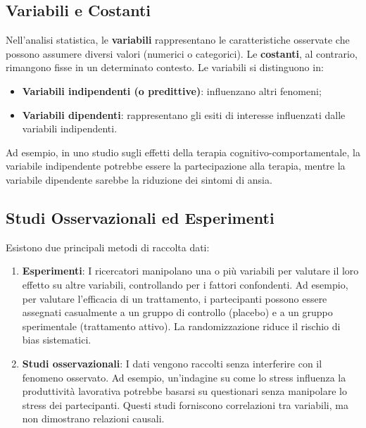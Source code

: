 \documentclass[
  letterpaper,
]{krantz}
\providecommand{\tightlist}{%
  \setlength{\itemsep}{0pt}\setlength{\parskip}{0pt}}\usepackage{longtable,booktabs,array}
\begin{document}
\subsection{Variabili e Costanti}\label{variabili-e-costanti}

Nell'analisi statistica, le \textbf{variabili} rappresentano le
caratteristiche osservate che possono assumere diversi valori (numerici
o categorici). Le \textbf{costanti}, al contrario, rimangono fisse in un
determinato contesto. Le variabili si distinguono in:

\begin{itemize}
\tightlist
\item
  \textbf{Variabili indipendenti (o predittive)}: influenzano altri
  fenomeni;\\
\item
  \textbf{Variabili dipendenti}: rappresentano gli esiti di interesse
  influenzati dalle variabili indipendenti.
\end{itemize}

Ad esempio, in uno studio sugli effetti della terapia
cognitivo-comportamentale, la variabile indipendente potrebbe essere la
partecipazione alla terapia, mentre la variabile dipendente sarebbe la
riduzione dei sintomi di ansia.

\subsection{Studi Osservazionali ed
Esperimenti}\label{studi-osservazionali-ed-esperimenti}

Esistono due principali metodi di raccolta dati:

\begin{enumerate}
\def\labelenumi{\arabic{enumi}.}
\item
  \textbf{Esperimenti}: I ricercatori manipolano una o più variabili per
  valutare il loro effetto su altre variabili, controllando per i
  fattori confondenti. Ad esempio, per valutare l'efficacia di un
  trattamento, i partecipanti possono essere assegnati casualmente a un
  gruppo di controllo (placebo) e a un gruppo sperimentale (trattamento
  attivo). La randomizzazione riduce il rischio di bias sistematici.
\item
  \textbf{Studi osservazionali}: I dati vengono raccolti senza
  interferire con il fenomeno osservato. Ad esempio, un'indagine su come
  lo stress influenza la produttività lavorativa potrebbe basarsi su
  questionari senza manipolare lo stress dei partecipanti. Questi studi
  forniscono correlazioni tra variabili, ma non dimostrano relazioni
  causali.
\end{enumerate}
\end{document}
